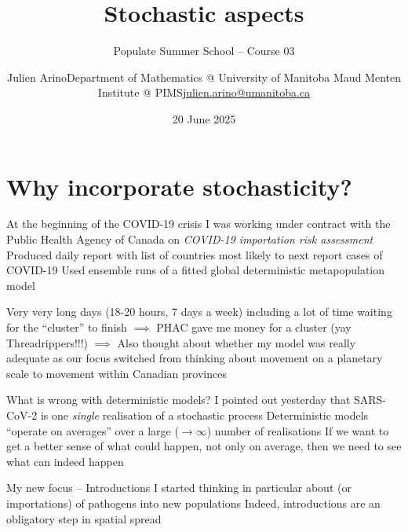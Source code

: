 \documentclass[aspectratio=169]{beamer}
\title{Stochastic aspects}
\subtitle{Populate Summer School -- Course 03}
\date{20 June 2025}
\author{\texorpdfstring{Julien Arino\newline Department of Mathematics @ University of Manitoba \newline Maud Menten Institute @ PIMS\newline\url{julien.arino@umanitoba.ca}}{Julien Arino}}
\begin{document}


\section{Why incorporate stochasticity?}

\begin{frame}{At the beginning of the COVID-19 crisis}
\bbullet 
I was working under contract with the Public Health Agency of Canada on \emph{COVID-19 importation risk assessment}
\vfill
\bbullet 
Produced daily report with list of countries most likely to next report cases of COVID-19
\vfill
\bbullet
Used ensemble runs of a fitted global deterministic metapopulation model
\end{frame}


\begin{frame}
\bbullet Very very long days (18-20 hours, 7 days a week)
\vfill
\bbullet including a lot of time waiting for the ``cluster'' to finish
\vfill
$\implies$ PHAC gave me money for a cluster (yay Threadrippers!!!)
\vfill
$\implies$ Also thought about whether my model was really adequate as our focus switched from thinking about movement on a planetary scale to movement within Canadian provinces
\end{frame}

\begin{frame}{What is wrong with deterministic models?}
\bbullet I pointed out yesterday that SARS-CoV-2 is one \emph{single} realisation of a stochastic process
\vfill
\bbullet Deterministic models ``operate on averages'' over a large ($\to\infty$) number of realisations
\vfill
\bbullet If we want to get a better sense of what could happen, not only on average, then we need to see what can indeed happen
\end{frame}

\begin{frame}{My new focus -- Introductions}
\bbullet I started thinking in particular about  (or importations) of pathogens into new populations
\vfill
\bbullet Indeed, introductions are an obligatory step in spatial spread
\end{frame}
\end{document}
